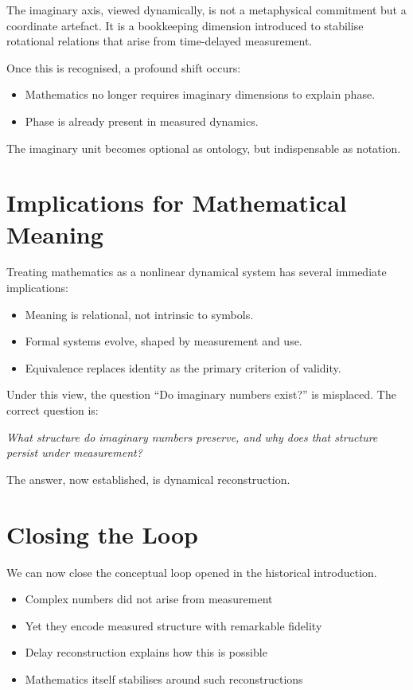 \documentclass[12pt]{book}  %
\begin{document}
The imaginary axis, viewed dynamically, is not a metaphysical commitment but a coordinate artefact. It is a bookkeeping dimension introduced to stabilise rotational relations that arise from time-delayed measurement.

Once this is recognised, a profound shift occurs:

\begin{itemize}
    \item Mathematics no longer requires imaginary dimensions to explain phase.
    \item Phase is already present in measured dynamics.
\end{itemize}

The imaginary unit becomes optional as ontology, but indispensable as notation.

\section*{Implications for Mathematical Meaning}

Treating mathematics as a nonlinear dynamical system has several immediate implications:

\begin{itemize}
    \item Meaning is relational, not intrinsic to symbols.
    \item Formal systems evolve, shaped by measurement and use.
    \item Equivalence replaces identity as the primary criterion of validity.
\end{itemize}

Under this view, the question “Do imaginary numbers exist?” is misplaced. The correct question is:

\textit{What structure do imaginary numbers preserve, and why does that structure persist under measurement?}

The answer, now established, is dynamical reconstruction.

\section*{Closing the Loop}

We can now close the conceptual loop opened in the historical introduction.

\begin{itemize}
    \item Complex numbers did not arise from measurement
    \item Yet they encode measured structure with remarkable fidelity
    \item Delay reconstruction explains how this is possible
    \item Mathematics itself stabilises around such reconstructions
\end{itemize}
\end{document}
